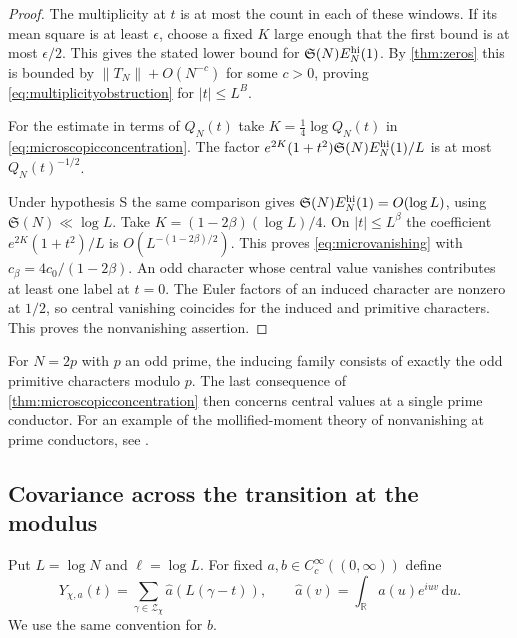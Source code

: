 \documentclass[11pt,a4paper]{article}
\numberwithin{equation}{section}
\newcommand{\SSS}{\mathfrak S}
\newcommand{\ud}{\mathrm d}
\begin{document}
\begin{proof}
The multiplicity at $t$ is at most the count in each of
these windows. If its mean square is at least $\epsilon$,
choose a fixed $K$ large enough that the first bound is
at most $\epsilon/2$. This gives the stated lower bound
for $\SSS(N)E_N^{\rm hi}(1)$. By \cref{thm:zeros} this is
bounded by $\|T_N\|+O(N^{-c})$ for some $c>0$, proving
\cref{eq:multiplicityobstruction} for $|t|\le L^B$.

For the estimate in terms of $Q_N(t)$ take
$K=\frac14\log Q_N(t)$ in \cref{eq:microscopicconcentration}.
The factor $e^{2K}(1+t^2)\SSS(N) E_N^{\rm hi}(1)/L$
is at most $Q_N(t)^{-1/2}$.

Under hypothesis S the same comparison gives
$\SSS(N)E_N^{\rm hi}(1)=O(\log L)$, using
$\SSS(N)\ll\log L$. Take
$K=(1-2\beta)(\log L)/4$. On $|t|\le L^\beta$
the coefficient $e^{2K}(1+t^2)/L$ is
$O(L^{-(1-2\beta)/2})$. This proves
\cref{eq:microvanishing} with $c_\beta=4c_0/(1-2\beta)$.
An odd character whose central value vanishes contributes
at least one label at $t=0$. The Euler factors of an
induced character are nonzero at $1/2$, so central
vanishing coincides for the induced and primitive
characters. This proves the nonvanishing assertion.
\end{proof}

For $N=2p$ with $p$ an odd prime, the inducing family
consists of exactly the odd primitive characters modulo
$p$. The last consequence of \cref{thm:microscopicconcentration}
then concerns central values at a single prime conductor.
For an example of the mollified-moment theory of
nonvanishing at prime conductors, see \cite{KMNNonvanishing}.

\subsection{Covariance across the transition at the modulus}

Put $L=\log N$ and $\ell=\log L$. For fixed $a,b\in
C_c^\infty((0,\infty))$ define
\[
 Y_{\chi,a}(t)=
       \sum_{\gamma\in\mathcal Z_\chi}\widehat a(L(\gamma-t)),
 \qquad
 \widehat a(v)=\int_{\mathbb R}a(u)e^{iuv}\,\ud u.
\]
We use the same convention for $b$.
\end{document}
